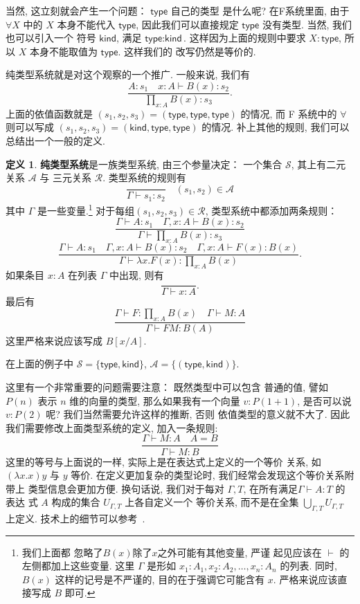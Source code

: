 \documentclass[UTF8]{ctexbook}
\newcommand{\cons}[1]{\textsf{#1}}
\theoremstyle{plain}
\theoremstyle{definition}
\newtheorem{definition}{定义}[chapter]
\theoremstyle{remark}
\begin{document}
当然, 这立刻就会产生一个问题： \(\cons{type}\) 自己的类型
是什么呢? 在F系统里面, 由于 \(\forall X\) 中的 \(X\)
本身不能代入 \(\cons{type}\), 因此我们可以直接规定
\(\cons{type}\) 没有类型. 当然, 我们也可以引入一个
符号 \(\cons{kind}\), 满足 \(\cons{type} : \cons{kind}\).
这样因为上面的规则中要求 \(X : \cons{type}\),
所以 \(X\) 本身不能取值为 \(\cons{type}\). 这样我们的
改写仍然是等价的.

纯类型系统就是对这个观察的一个推广. 一般来说, 我们有
\[\frac{A : s_1 \quad x{:}A \vdash B(x) : s_2}{\prod_{x:A}B(x) : s_3}.\]
上面的依值函数就是 \((s_1,s_2,s_3) = (\cons{type}, \cons{type}, \cons{type})\)
的情况, 而 F 系统中的 \(\forall\) 则可以写成
\((s_1,s_2,s_3) = (\cons{kind}, \cons{type}, \cons{type})\)
的情况. 补上其他的规则, 我们可以总结出一个一般的定义.
\begin{definition}
\textbf{纯类型系统}是一族类型系统, 由三个参量决定：
一个集合 \(\mathcal S\),
其上有二元关系 \(\mathcal A\) 与
三元关系 \(\mathcal R\). 类型系统的规则有
\[\frac{}{\Gamma\vdash s_1 : s_2} \quad (s_1, s_2) \in \mathcal A\]
其中 \(\Gamma\) 是一些变量.\footnote{我们上面都
忽略了\(B(x)\)除了\(x\)之外可能有其他变量, 严谨
起见应该在 \(\vdash\) 的左侧都加上这些变量. 这里 \(\Gamma\)
是形如 \(x_1{:}A_1, x_2{:}A_2, \dots, x_n{:}A_n\) 的列表.
同时, \(B(x)\) 这样的记号是不严谨的, 目的在于强调它可能含有 \(x\).
严格来说应该直接写成 \(B\) 即可.}
对于每组\((s_1,s_2,s_3)\in \mathcal R\),
类型系统中都添加两条规则：
\[\frac{\Gamma \vdash A : s_1 \quad \Gamma, x{:}A \vdash B(x) : s_2}{\Gamma \vdash \prod_{x:A} B(x) : s_3}\]
\[\frac{\Gamma \vdash A : s_1 \quad \Gamma, x{:}A \vdash B(x) : s_2\quad
\Gamma, x{:}A \vdash F(x) : B(x)}
{\Gamma \vdash \lambda x. F(x) : \prod_{x:A}B(x)}.\]
如果条目 \(x : A\) 在列表 \(\Gamma\) 中出现, 则有
\[\frac{}{\Gamma \vdash x : A}.\]
最后有
\[\frac{\Gamma \vdash F : \prod_{x:A}B(x) \quad
\Gamma \vdash M : A}{\Gamma \vdash FM : B(A)}\]
这里严格来说应该写成 \(B[x/A]\).
\end{definition}
在上面的例子中 \(\mathcal S = \{\cons{type}, \cons{kind}\}\),
\(\mathcal A = \{(\cons{type}, \cons{kind})\}\).

这里有一个非常重要的问题需要注意： 既然类型中可以包含
普通的值, 譬如 \(P(n)\) 表示 \(n\) 维的向量的类型,
那么如果我有一个向量 \(v : P(1+1)\), 是否可以说
\(v : P(2)\) 呢? 我们当然需要允许这样的推断, 否则
依值类型的意义就不大了. 因此我们需要修改上面类型系统的定义,
加入一条规则:
\[\frac{\Gamma \vdash M : A \quad A = B}{\Gamma \vdash M : B}\]
这里的等号与上面说的一样, 实际上是在表达式上定义的一个等价
关系, 如 \((\lambda x. x)y\) 与 \(y\) 等价.
在定义更加复杂的类型论时, 我们经常会发现这个等价关系附带上
类型信息会更加方便. 换句话说, 我们对于每对 \(\Gamma, T\),
在所有满足\(\Gamma \vdash A : T\) 的表达
式 \(A\) 构成的集合 \(U_{\Gamma, T}\) 上各自定义一个
等价关系, 而不是在全集 \(\bigcup_{\Gamma, T} U_{\Gamma, T}\) 上定义.
技术上的细节可以参考~\cite{barendregt:1992:lambda}.
\end{document}
